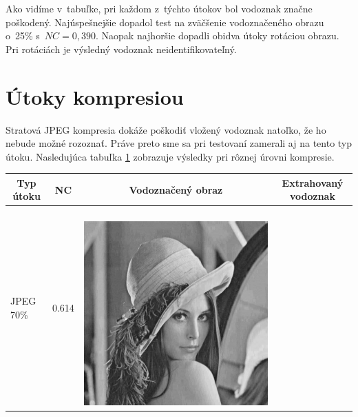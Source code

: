 Ako vidíme v~tabuľke, pri každom z~týchto útokov bol vodoznak značne poškodený. Najúspešnejšie dopadol test na zväčšenie vodoznačeného obrazu o~25\% s~$NC=0,390$. Naopak najhoršie dopadli obidva útoky rotáciou obrazu. Pri rotáciách je výsledný vodoznak neidentifikovateľný.

\clearpage
\section{Útoky kompresiou} \label{compress}
Stratová JPEG kompresia dokáže poškodiť vložený vodoznak natoľko, že ho nebude možné rozoznať. Práve preto sme sa pri testovaní zamerali aj na tento typ útoku. Nasledujúca tabuľka \ref{compress-table} zobrazuje výsledky pri rôznej úrovni kompresie.
\begin{table}[h]
\centering
\label{compress-table}
\begin{tabular}{llcc}
\hline
\multicolumn{1}{c}{\textbf{Typ útoku}} & \multicolumn{1}{c}{\textbf{NC}} & \multicolumn{1}{c}{\textbf{Vodoznačený obraz}} & \multicolumn{1}{c}{\textbf{Extrahovaný vodoznak}} \\ \hline
JPEG 70\%                       & 0.614 &
\begin{minipage}[c]{.1\textwidth}
\ 
  \includegraphics[scale=0.1]{obrazky/jpeg70}
\end{minipage} &

\end{tabular}
\end{table}
